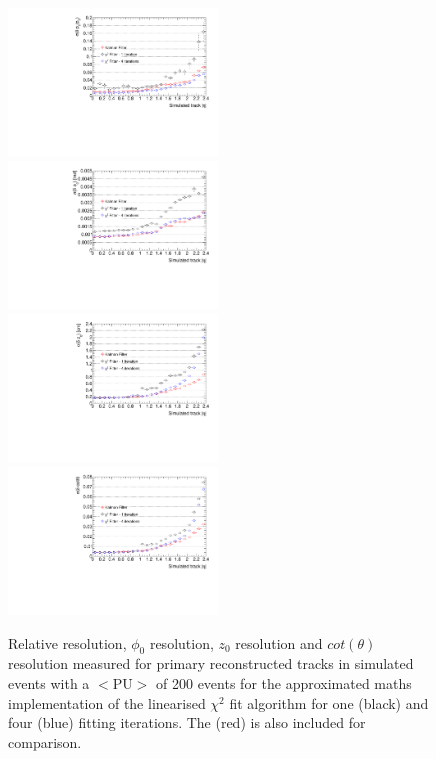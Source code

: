 \begin{figure}[htb]
\centering
\includegraphics[width=0.495\textwidth]{figs/tk-upgrade/results-chi2fitter/ptRelResVsEta_IterationComparison.pdf}
\includegraphics[width=0.495\textwidth]{figs/tk-upgrade/results-chi2fitter/phi0ResVsEta_IterationComparison.pdf}
\\
\includegraphics[width=0.495\textwidth]{figs/tk-upgrade/results-chi2fitter/z0ResVsEta_IterationComparison.pdf}
\includegraphics[width=0.495\textwidth]{figs/tk-upgrade/results-chi2fitter/cotThetaResVsEta_IterationComparison.pdf}
\caption{
Relative \pt resolution, $\phi_{0}$ resolution, $z_{0}$ resolution and $cot(\theta)$ resolution measured for primary reconstructed tracks in simulated \ttbar events with a $<\textrm{PU}>$ of 200 events for the approximated maths implementation of the linearised $\chi^{2}$ fit algorithm for one (black) and four (blue) fitting iterations. The \KF (red) is also included for comparison.
}
\label{fig:chi2HelixParametersResIterationsComparison}
\end{figure}

